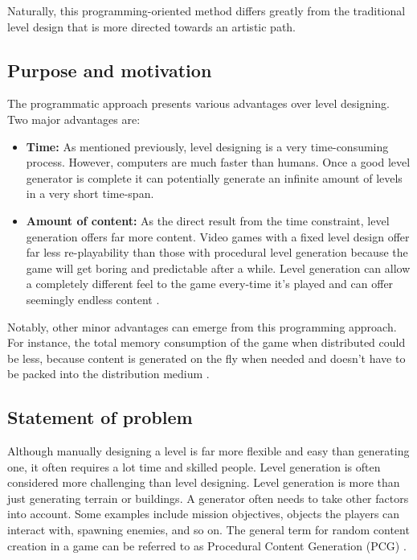 \documentclass{ueacmpstyle}
\begin{document}
Naturally, this programming-oriented method differs greatly from the traditional level design that is more directed towards an artistic path.

\subsection{Purpose and motivation}
The programmatic approach presents various advantages over level designing. Two major advantages are:
\begin{itemize}
\item {\bf Time:} As mentioned previously, level designing is a very time-consuming process. However, computers are much faster than humans. Once a good level generator is complete it can potentially generate an infinite amount of levels in a very short time-span. 

\item {\bf Amount of content:} As the direct result from the time constraint, level generation offers far more content. Video games with a fixed level design offer far less re-playability than those with procedural level generation because the game will get boring and predictable after a while. Level generation can allow a completely different feel to the game every-time it's played and can offer seemingly endless content \citep{DBLP:conf/aiide/ComptonM06}.
\end{itemize}

Notably, other minor advantages can emerge from this programming approach. For instance, the total memory consumption of the game when distributed could be less, because content is generated on the fly when needed and doesn't have to be packed into the distribution medium \citep{DBLP:journals/tciaig/TogeliusYSB11}.

\subsection{Statement of problem}
Although manually designing a level is far more flexible and easy than generating one, it often requires a lot time and skilled people. Level generation is often considered more challenging than level designing. Level generation is more than just generating terrain or buildings. A generator often needs to take other factors into account. Some examples include mission objectives, objects the players can interact with, spawning enemies, and so on. The general term for random content creation in a game can be referred to as Procedural Content Generation (PCG) \citep{DBLP:journals/tciaig/AshlockLM11}.
\end{document}
